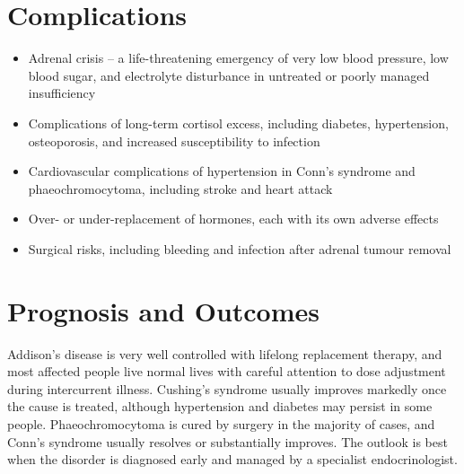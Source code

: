 \section*{Complications}
\begin{itemize}
    \item Adrenal crisis -- a life-threatening emergency of very low blood pressure, low blood sugar, and electrolyte disturbance in untreated or poorly managed insufficiency
    \item Complications of long-term cortisol excess, including diabetes, hypertension, osteoporosis, and increased susceptibility to infection
    \item Cardiovascular complications of hypertension in Conn's syndrome and phaeochromocytoma, including stroke and heart attack
    \item Over- or under-replacement of hormones, each with its own adverse effects
    \item Surgical risks, including bleeding and infection after adrenal tumour removal
\end{itemize}

\section*{Prognosis and Outcomes}
Addison's disease is very well controlled with lifelong replacement therapy, and most affected people live normal lives with careful attention to dose adjustment during intercurrent illness. Cushing's syndrome usually improves markedly once the cause is treated, although hypertension and diabetes may persist in some people. Phaeochromocytoma is cured by surgery in the majority of cases, and Conn's syndrome usually resolves or substantially improves. The outlook is best when the disorder is diagnosed early and managed by a specialist endocrinologist.

